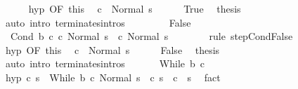 \begin{isabellebody}
\ \ \ \ \isamarkupfalse%
\ hyp\ {\isacharbrackleft}OF\ this{\isacharbrackright}\ \isamarkupfalse%
\ {\isachardoublequoteopen}{\isasymGamma}{\isasymturnstile}c\ {\isasymdown}\ Normal\ s{\isachardoublequoteclose}\isacommand{{\isachardot}}\isamarkupfalse%
\isanewline
\ \ \ \ \isamarkupfalse%
\ True\ \isamarkupfalse%
\ {\isacharquery}thesis\isanewline
\ \ \ \ \ \ \isamarkupfalse%
\ {\isacharparenleft}auto\ intro{\isacharcolon}\ terminates{\isachardot}intros{\isacharparenright}\isanewline
\ \ \isamarkupfalse%
\isanewline
\ \ \ \ \isamarkupfalse%
\ False\isanewline
\ \ \ \ \isamarkupfalse%
\ \isamarkupfalse%
\ {\isachardoublequoteopen}{\isasymGamma}{\isasymturnstile}\ {\isacharparenleft}Cond\ b\ c\ c\ Normal\ s{\isacharparenright}\ {\isasymrightarrow}\ {\isacharparenleft}c\ Normal\ s{\isacharparenright}{\isachardoublequoteclose}\isanewline
\ \ \ \ \ \ \isamarkupfalse%
\ {\isacharparenleft}rule\ step{\isachardot}CondFalse{\isacharparenright}\isanewline
\ \ \ \ \isamarkupfalse%
\ hyp\ {\isacharbrackleft}OF\ this{\isacharbrackright}\ \isamarkupfalse%
\ {\isachardoublequoteopen}{\isasymGamma}{\isasymturnstile}c\ {\isasymdown}\ Normal\ s{\isachardoublequoteclose}\isacommand{{\isachardot}}\isamarkupfalse%
\isanewline
\ \ \ \ \isamarkupfalse%
\ False\ \isamarkupfalse%
\ {\isacharquery}thesis\isanewline
\ \ \ \ \ \ \isamarkupfalse%
\ {\isacharparenleft}auto\ intro{\isacharcolon}\ terminates{\isachardot}intros{\isacharparenright}\isanewline
\ \ \isamarkupfalse%
\isanewline
{}\isamarkupfalse%
\isanewline
\ \ \isamarkupfalse%
\ {\isacharparenleft}While\ b\ c{\isacharparenright}\isanewline
\ \ \isamarkupfalse%
\ hyp{\isacharcolon}\ {\isachardoublequoteopen}{\isasymAnd}c{\isacharprime}\ s{\isacharprime}{\isachardot}\ {\isasymGamma}{\isasymturnstile}\ {\isacharparenleft}While\ b\ c{\isacharcomma}\ Normal\ s{\isacharparenright}\ {\isasymrightarrow}\ {\isacharparenleft}c{\isacharprime}{\isacharcomma}\ s{\isacharprime}{\isacharparenright}\ {\isasymLongrightarrow}\ {\isasymGamma}{\isasymturnstile}c{\isacharprime}\ {\isasymdown}\ s{\isacharprime}{\isachardoublequoteclose}\ \isamarkupfalse%
\ fact\isanewline

\end{isabellebody}
